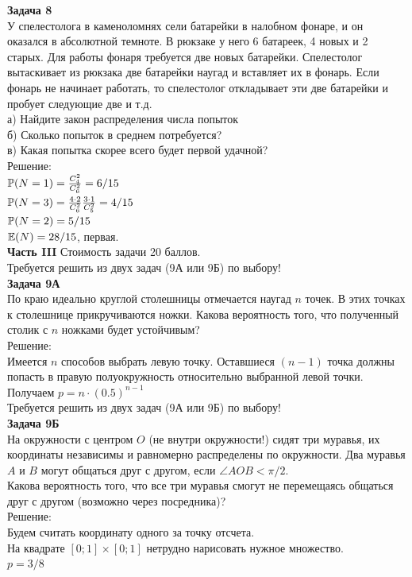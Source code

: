 \documentclass[12pt, a4paper]{article}\usepackage[]{graphicx}\usepackage[]{color}
\begin{document}
\textbf{Задача 8} \\ %
У спелестолога в каменоломнях сели батарейки в налобном фонаре, и он оказался в абсолютной темноте. В рюкзаке у него 6 батареек, 4 новых и 2 старых. Для работы фонаря требуется две новых батарейки. Спелестолог вытаскивает из рюкзака две батарейки наугад и вставляет их в фонарь. Если фонарь не начинает работать, то спелестолог откладывает эти две батарейки и пробует следующие две и т.д. \\
а) Найдите закон распределения числа попыток \\
б) Сколько попыток в среднем потребуется? \\
в) Какая попытка скорее всего будет первой удачной? \\
Решение: \\
$\P(N=1)=\frac{C_{4}^{2}}{C_{6}^{2}}=6/15$ \\
$\P(N=3)=\frac{4\cdot 2}{C_{6}^{2}}\frac{3\cdot 1}{C_{5}^{2}}=4/15$\\
$\P(N=2)=5/15$ \\
$\E(N)=28/15$, первая. \\


\textbf{Часть III} Стоимость задачи 20 баллов. \\

Требуется решить \textbf{} из двух задач (9А или 9Б) по
выбору! \\

\textbf{Задача 9А} \\
По краю идеально круглой столешницы отмечается наугад $n$ точек. В этих точках к столешнице прикручиваются ножки. Какова вероятность того, что полученный столик с $n$ ножками будет устойчивым? \\
Решение: \\
Имеется $n$ способов выбрать левую точку. Оставшиеся $(n-1)$ точка должны попасть в правую полуокружность относительно выбранной левой точки.\\
Получаем $p=n\cdot (0.5)^{n-1}$ \\


Требуется решить \textbf{} из двух задач (9А или 9Б) по
выбору! \\

\textbf{Задача 9Б} \\
На окружности  с центром $O$ (не внутри окружности!) сидят три муравья, их
координаты независимы и равномерно распределены по окружности. Два
муравья $A$ и $B$ могут общаться друг с другом, если $\angle AOB<\pi/2$. \\
Какова вероятность того, что все три муравья смогут не перемещаясь
общаться друг с другом (возможно через посредника)? \\
Решение: \\
Будем считать координату одного за точку отсчета. \\
На квадрате $[0;1]\times[0;1]$ нетрудно нарисовать нужное множество. \\
$p=3/8$ \\
\end{document}
